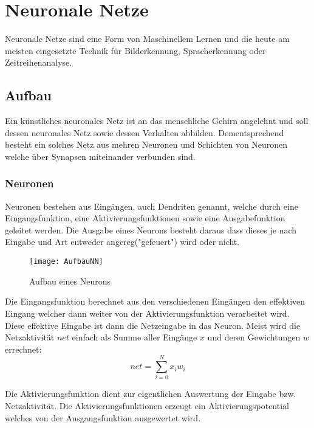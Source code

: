     \section{Neuronale Netze}
    \cite[Vgl. im Folgenden]{EinfuehrunginNN,WissensbasierteSysteme}
    Neuronale Netze sind eine Form von Maschinellem Lernen und die heute am meisten eingesetzte Technik für Bilderkennung, Spracherkennung oder Zeitreihenanalyse.
    
    \subsection{Aufbau}
    Ein künstliches neuronales Netz ist an das menschliche Gehirn angelehnt und soll dessen neuronales Netz sowie dessen Verhalten abbilden. 
    Dementsprechend besteht ein solches Netz aus mehren Neuronen und Schichten von Neuronen welche über Synapsen miteinander verbunden sind.


    \subsubsection{Neuronen}
    Neuronen bestehen aus Eingängen, auch Dendriten genannt, welche durch eine Eingangsfunktion, eine Aktivierungsfunktionen sowie eine Ausgabefunktion geleitet werden.
    Die Ausgabe eines Neurons besteht daraus dass dieses je nach Eingabe und Art entweder angereg("gefeuert") wird oder nicht.
    
    \begin{figure}[H]
        \centering
        \texttt{[image: AufbauNN]}
        \caption{Aufbau eines Neurons}
        \label{fig:AufbauNN}
    \end{figure}
    
    \noindent
    Die Eingangsfunktion berechnet aus den verschiedenen Eingängen den effektiven Eingang welcher dann weiter von der Aktivierungsfunktion verarbeitet wird.
    Diese effektive Eingabe ist dann die Netzeingabe in das Neuron.
    Meist wird die Netzaktivität \(net\) einfach als Summe aller Eingänge \(x\) und deren Gewichtungen \(w\) errechnet:
    \begin{equation}
        net = \sum_{i=0}^N x_i w_i
    \end{equation}
    \newline

    \noindent
    Die Aktivierungsfunktion dient zur eigentlichen Auswertung der Eingabe bzw. Netzaktivität.
    Die Aktivierungsfunktionen erzeugt ein Aktivierungspotential welches von der Ausgangsfunktion ausgewertet wird.
    \newline
    
